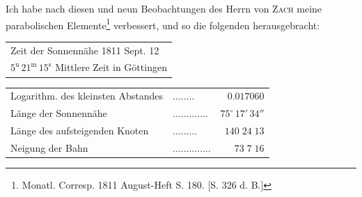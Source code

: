 \par\indent Ich habe nach diesen und neun Beobachtungen des Herrn von \textsc{Zach} meine parabolischen Elemente\footnote{Monatl. Corresp. 1811 August-Heft S. 180. [S. 326 d. B.]} verbessert, und so die folgenden herausgebracht:
\begin{center}\fontsize{10}{12}\selectfont\setlength{\tabcolsep}{4pt}\renewcommand{\arraystretch}{1.15}\begin{tabular}{l}
Zeit der Sonnennähe 1811 Sept. 12\\
\quad $5^{\mathrm u}\,21^{\mathrm m}\,15^{\mathrm s}$ Mittlere Zeit in Göttingen\\
\end{tabular}\end{center}
\begin{center}\fontsize{10}{12}\selectfont\setlength{\tabcolsep}{4pt}\renewcommand{\arraystretch}{1.15}\begin{tabular}{llr}
Logarithm. des kleinsten Abstandes & .\;.\;.\;.\;.\;.\;.\;. & $0.017060$\\
Länge der Sonnennähe & .\;.\;.\;.\;.\;.\;.\;.\;.\;.\;.\;.\;. & $75^\circ\,17'\,34''$\\
Länge des aufsteigenden Knoten & .\;.\;.\;.\;.\;.\;.\;.\;. & $140\;24\;13$\\
Neigung der Bahn & .\;.\;.\;.\;.\;.\;.\;.\;.\;.\;.\;.\;.\;. & $73\;7\;16$\\
\end{tabular}\end{center}

